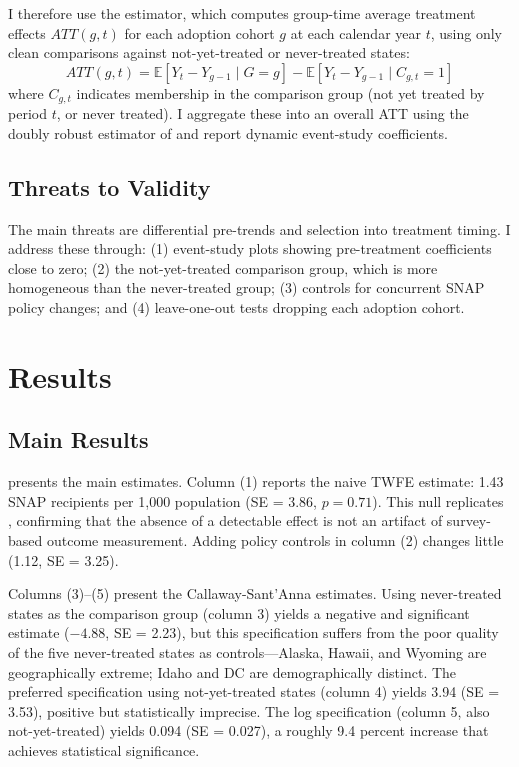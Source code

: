 \documentclass[12pt]{article}
\newcommand{\E}{\mathbb{E}}
\begin{document}
I therefore use the \citet{callaway2021} estimator, which computes group-time average treatment effects $ATT(g,t)$ for each adoption cohort $g$ at each calendar year $t$, using only clean comparisons against not-yet-treated or never-treated states:
\begin{equation}
ATT(g,t) = \E[Y_t - Y_{g-1} \mid G = g] - \E[Y_t - Y_{g-1} \mid C_{g,t} = 1]
\label{eq:cs}
\end{equation}
where $C_{g,t}$ indicates membership in the comparison group (not yet treated by period $t$, or never treated). I aggregate these into an overall ATT using the doubly robust estimator of \citet{callaway2021} and report dynamic event-study coefficients.

\subsection{Threats to Validity}

The main threats are differential pre-trends and selection into treatment timing. I address these through: (1) event-study plots showing pre-treatment coefficients close to zero; (2) the not-yet-treated comparison group, which is more homogeneous than the never-treated group; (3) controls for concurrent SNAP policy changes; and (4) leave-one-out tests dropping each adoption cohort.

\section{Results}

\subsection{Main Results}

 presents the main estimates. Column (1) reports the naive TWFE estimate: 1.43 SNAP recipients per 1,000 population (SE = 3.86, $p = 0.71$). This null replicates \citet{jones2021}, confirming that the absence of a detectable effect is not an artifact of survey-based outcome measurement. Adding policy controls in column (2) changes little (1.12, SE = 3.25).

Columns (3)--(5) present the Callaway-Sant'Anna estimates. Using never-treated states as the comparison group (column 3) yields a negative and significant estimate ($-4.88$, SE = 2.23), but this specification suffers from the poor quality of the five never-treated states as controls---Alaska, Hawaii, and Wyoming are geographically extreme; Idaho and DC are demographically distinct. The preferred specification using not-yet-treated states (column 4) yields 3.94 (SE = 3.53), positive but statistically imprecise. The log specification (column 5, also not-yet-treated) yields 0.094 (SE = 0.027), a roughly 9.4 percent increase that achieves statistical significance.
\end{document}
